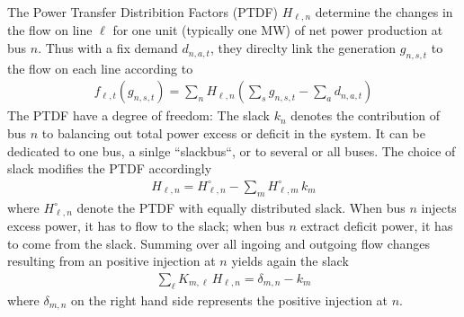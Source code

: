 \documentclass[11pt]{article}
\newcommand{\generation}[1][n]{g_{#1,s,t}}
\newcommand{\demand}[1][n]{d_{#1,a,t}}
\newcommand{\incidence}[1][n]{K_{#1,\ell}}
\newcommand{\ptdf}[1][n]{H_{\ell,#1}}
\newcommand{\ptdfEqual}[1][n]{\ptdf[#1]^\circ}
\newcommand{\slack}[1][n]{k_{#1}}
\newcommand{\flow}{f_{\ell,t}}
\newcommand{\pdv}[2]{\frac{\partial #1}{\partial #2}}
\begin{document}
The Power Transfer Distribition Factors (PTDF) $\ptdf$ determine the changes in the flow on line $\ell$ for one unit (typically one MW) of net power production at bus $n$. Thus with a fix demand $\demand$, they direclty link the generation $\generation$ to the flow on each line according to
\begin{align}
 \flow\left( \generation\right)  = \sum_n \ptdf \left( \sum_s \generation- \sum_a \demand \right)  
 \label{eq:flow_from_ptdf}
\end{align}
The PTDF have a degree of freedom: The slack $\slack$ denotes the contribution of bus $n$ to balancing out total power excess or deficit in the system. It can be dedicated to one bus, a sinlge ``slackbus``, or to several or all buses. The choice of slack modifies the PTDF accordingly 
\begin{align}
 \ptdf = \ptdfEqual - \sum_m \ptdfEqual[m]  \, \slack[m]
 \label{eq:ptdf_slacked}
\end{align}
where $\ptdfEqual$ denote the PTDF with equally distributed slack.
When bus $n$ injects excess power, it has to flow to the slack; when bus $n$ extract deficit power, it has to come from the slack. Summing over all ingoing and outgoing flow changes resulting from an positive injection at $n$ yields again the slack 
\begin{align}
\sum_\ell \incidence[m] \, \ptdf =  \delta_{m,n} - \slack[m] 
\label{eq:slack}
\end{align}
where $\delta_{m,n}$ on the right hand side represents the positive injection at $n$.
\end{document}
